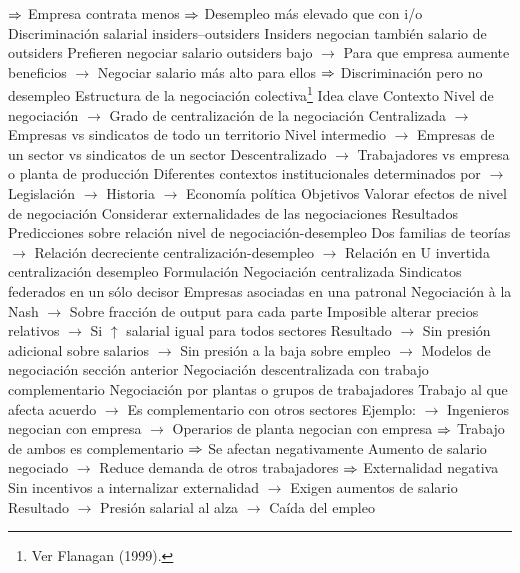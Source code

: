 \documentclass{nuevotema}
\begin{document}
\begin{esquemal}
				\4[] $\Rightarrow$ Empresa contrata menos
				\4[] $\Rightarrow$ Desempleo más elevado que con i/o
				\4 Discriminación salarial insiders--outsiders
				\4[] Insiders negocian también salario de outsiders
				\4[] Prefieren negociar salario outsiders bajo
				\4[] $\to$ Para que empresa aumente beneficios
				\4[] $\to$ Negociar salario más alto para ellos
				\4[] $\Rightarrow$ Discriminación pero no desempleo
		\2 Estructura de la negociación colectiva\footnote{Ver Flanagan (1999).}
			\3 Idea clave
				\4 Contexto
				\4[] Nivel de negociación
				\4[] $\to$ Grado de centralización de la negociación
				\4[] Centralizada
				\4[] $\to$ Empresas vs sindicatos de todo un territorio
				\4[] Nivel intermedio
				\4[] $\to$ Empresas de un sector vs sindicatos de un sector
				\4[] Descentralizado
				\4[] $\to$ Trabajadores vs empresa o planta de producción
				\4[] Diferentes contextos institucionales determinados por
				\4[] $\to$ Legislación
				\4[] $\to$ Historia
				\4[] $\to$ Economía política
				\4 Objetivos
				\4[] Valorar efectos de nivel de negociación
				\4[] Considerar externalidades de las negociaciones
				\4 Resultados
				\4[] Predicciones sobre relación nivel de negociación-desempleo
				\4[] Dos familias de teorías
				\4[] $\to$ Relación decreciente centralización-desempleo
				\4[] $\to$ Relación en U invertida centralización desempleo
			\3 Formulación
				\4 Negociación centralizada
				\4[] Sindicatos federados en un sólo decisor
				\4[] Empresas asociadas en una patronal
				\4[] Negociación à la Nash
				\4[] $\to$ Sobre fracción de output para cada parte
				\4[] Imposible alterar precios relativos
				\4[] $\to$ Si $\uparrow$ salarial igual para todos sectores
				\4[] Resultado
				\4[] $\to$ Sin presión adicional sobre salarios
				\4[] $\to$ Sin presión a la baja sobre empleo
				\4[] $\to$ Modelos de negociación sección anterior
				\4 Negociación descentralizada con trabajo complementario
				\4[] Negociación por plantas o grupos de trabajadores
				\4[] Trabajo al que afecta acuerdo
				\4[] $\to$ Es complementario con otros sectores
				\4[] Ejemplo:
				\4[] $\to$ Ingenieros negocian con empresa
				\4[] $\to$ Operarios de planta negocian con empresa
				\4[] $\Rightarrow$ Trabajo de ambos es complementario
				\4[] $\Rightarrow$ Se afectan negativamente
				\4[] Aumento de salario negociado
				\4[] $\to$ Reduce demanda de otros trabajadores
				\4[] $\Rightarrow$ Externalidad negativa
				\4[] Sin incentivos a internalizar externalidad
				\4[] $\to$ Exigen aumentos de salario
				\4[] Resultado
				\4[] $\to$ Presión salarial al alza
				\4[] $\to$ Caída del empleo

\end{esquemal}
\end{document}
